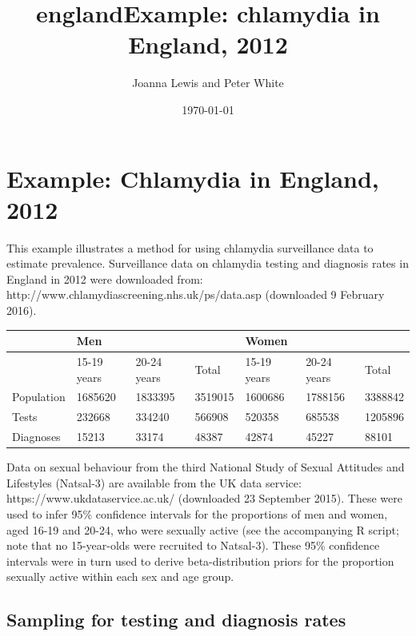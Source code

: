 \documentclass{article}
\title{england}
\begin{document}
    
    
    \author{Joanna Lewis and Peter White}\title{Example: chlamydia in England, 2012}

\date{\today}
\maketitle

    
    

    
    \section{Example: Chlamydia in England,
2012}\label{example-chlamydia-in-england-2012}

This example illustrates a method for using chlamydia surveillance data
to estimate prevalence. Surveillance data on chlamydia testing and
diagnosis rates in England in 2012 were downloaded from:
http://www.chlamydiascreening.nhs.uk/ps/data.asp (downloaded 9 February
2016).

\begin{longtable}[c]{@{}lllllll@{}}
\toprule
& Men & & & Women & &\tabularnewline
\midrule
\endhead
& 15-19 years & 20-24 years & Total & 15-19 years & 20-24 years &
Total\tabularnewline
Population & 1685620 & 1833395 & 3519015 & 1600686 & 1788156 &
3388842\tabularnewline
Tests & 232668 & 334240 & 566908 & 520358 & 685538 &
1205896\tabularnewline
Diagnoses & 15213 & 33174 & 48387 & 42874 & 45227 & 88101\tabularnewline
\bottomrule
\end{longtable}

Data on sexual behaviour from the third National Study of Sexual
Attitudes and Lifestyles (Natsal-3) are available from the UK data
service: https://www.ukdataservice.ac.uk/ (downloaded 23 September
2015). These were used to infer 95\% confidence intervals for the
proportions of men and women, aged 16-19 and 20-24, who were sexually
active (see the accompanying R script; note that no 15-year-olds were
recruited to Natsal-3). These 95\% confidence intervals were in turn
used to derive beta-distribution priors for the proportion sexually
active within each sex and age group.

\subsection{Sampling for testing and diagnosis
rates}\label{sampling-for-testing-and-diagnosis-rates}
\end{document}
